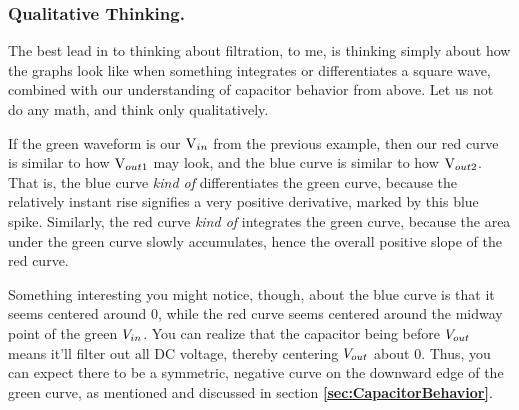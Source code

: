 \subsubsection{Qualitative Thinking.}

The best lead in to thinking about filtration, to me, is thinking simply about how the graphs look like when something integrates or differentiates a square wave, combined with our understanding of capacitor behavior from above. Let us not do any math, and think only qualitatively.\newline 

\begin{centering}
    
\end{centering}

If the green waveform is our ${\rm V}_{in}$ from the previous example, then our red curve is similar to how ${\rm V}_{out1}$ may look, and the blue curve is similar to how ${\rm V}_{out2}$. That is, the blue curve \textit{kind of} differentiates the green curve, because the relatively instant rise signifies a very positive derivative, marked by this blue spike. Similarly, the red curve \textit{kind of} integrates the green curve, because the area under the green curve slowly accumulates, hence the overall positive slope of the red curve.\newline 

Something interesting you might notice, though, about the blue curve is that it seems centered around 0, while the red curve seems centered around the midway point of the green ${V}_{in}$. You can realize that the capacitor being before ${V}_{out}$ means it'll filter out all DC voltage, thereby centering ${V}_{out}$ about 0. Thus, you can expect there to be a symmetric, negative curve on the downward edge of the green curve, as mentioned and discussed in section \textbf{\ref{sec:CapacitorBehavior}}.\newline

